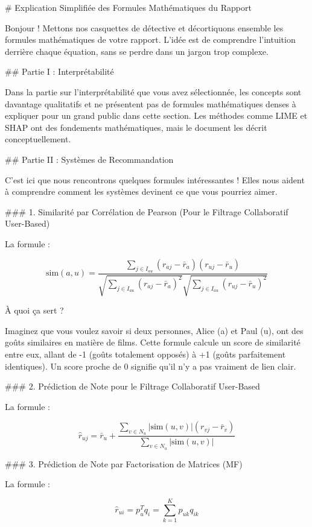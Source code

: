 # Explication Simplifiée des Formules Mathématiques du Rapport

Bonjour ! Mettons nos casquettes de détective et décortiquons ensemble les formules mathématiques de votre rapport. L'idée est de comprendre l'intuition derrière chaque équation, sans se perdre dans un jargon trop complexe.

## Partie I : Interprétabilité

Dans la partie sur l'interprétabilité que vous avez sélectionnée, les concepts sont davantage qualitatifs et ne présentent pas de formules mathématiques denses à expliquer pour un grand public dans cette section. Les méthodes comme LIME et SHAP ont des fondements mathématiques, mais le document les décrit conceptuellement.

## Partie II : Systèmes de Recommandation

C'est ici que nous rencontrons quelques formules intéressantes ! Elles nous aident à comprendre comment les systèmes devinent ce que vous pourriez aimer.

### 1. Similarité par Corrélation de Pearson (Pour le Filtrage Collaboratif User-Based)

La formule :

\[
\text{sim}(a,u) = \frac{\sum_{j \in I_{au}} \left( r_{aj} - \bar{r}_a \right) \left( r_{uj} - \bar{r}_u \right)}{\sqrt{\sum_{j \in I_{au}} \left( r_{aj} - \bar{r}_a \right)^2} \sqrt{\sum_{j \in I_{au}} \left( r_{uj} - \bar{r}_u \right)^2}}
\]

À quoi ça sert ?

Imaginez que vous voulez savoir si deux personnes, Alice (a) et Paul (u), ont des goûts similaires en matière de films. Cette formule calcule un score de similarité entre eux, allant de -1 (goûts totalement opposés) à +1 (goûts parfaitement identiques). Un score proche de 0 signifie qu'il n'y a pas vraiment de lien clair.

### 2. Prédiction de Note pour le Filtrage Collaboratif User-Based

La formule :

\[
\hat{r}_{uj} = \bar{r}_u + \frac{\sum_{v \in N_u} \left|\text{sim}(u,v)\right| \left( r_{vj} - \bar{r}_v \right)}{\sum_{v \in N_u} \left|\text{sim}(u,v)\right|}
\]

### 3. Prédiction de Note par Factorisation de Matrices (MF)

La formule :

\[
\hat{r}_{ui} = p_u^T q_i = \sum_{k=1}^K p_{uk} q_{ik}
\]

